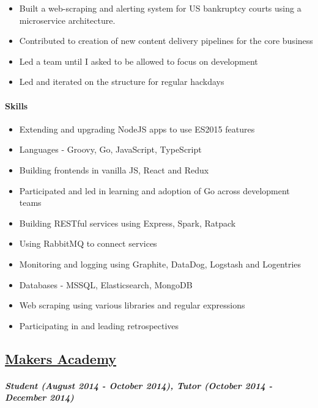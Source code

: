 \begin{itemize}
\tightlist
\item
  Built a web-scraping and alerting system for US bankruptcy courts
  using a microservice architecture.
\item
  Contributed to creation of new content delivery pipelines for the core
  business
\item
  Led a team until I asked to be allowed to focus on development
\item
  Led and iterated on the structure for regular hackdays
\end{itemize}

\hypertarget{skills-1}{%
\paragraph{Skills}\label{skills-1}}

\begin{itemize}
\tightlist
\item
  Extending and upgrading NodeJS apps to use ES2015 features
\item
  Languages - Groovy, Go, JavaScript, TypeScript
\item
  Building frontends in vanilla JS, React and Redux
\item
  Participated and led in learning and adoption of Go across development
  teams
\item
  Building RESTful services using Express, Spark, Ratpack
\item
  Using RabbitMQ to connect services
\item
  Monitoring and logging using Graphite, DataDog, Logstash and
  Logentries
\item
  Databases - MSSQL, Elasticsearch, MongoDB
\item
  Web scraping using various libraries and regular expressions
\item
  Participating in and leading retrospectives
\end{itemize}

\hypertarget{makers-academy}{%
\subsection{\texorpdfstring{\href{http://www.makersacademy.com/}{Makers
Academy}}{Makers Academy}}\label{makers-academy}}

\hypertarget{student-august-2014---october-2014-tutor-october-2014---december-2014}{%
\paragraph{\texorpdfstring{\emph{Student (August 2014 - October 2014),
Tutor (October 2014 - December
2014)}}{Student (August 2014 - October 2014), Tutor (October 2014 - December 2014)}}\label{student-august-2014---october-2014-tutor-october-2014---december-2014}}

